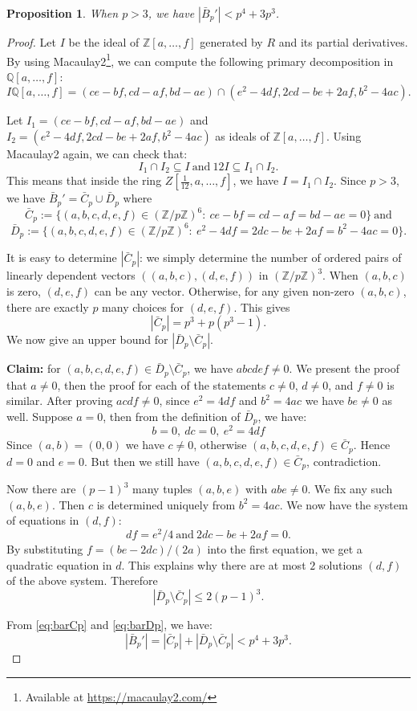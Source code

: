 \documentclass[12pt]{amsart}
\newtheorem{proposition}[theorem]{Proposition}
\newcommand{\Z}{\mathbb{Z}}
\newcommand{\Q}{\mathbb{Q}}
\numberwithin{equation}{section}
\begin{document}
\begin{proposition}\label{prop:barBp'}
    When $p>3$, we have $|\bar{B}_p'|<p^4+3p^3$.
\end{proposition}
\begin{proof}
    Let $I$ be the ideal of $\Z[a,\ldots,f]$ generated by $R$ and its partial derivatives. By using Macaulay2\footnote{Available at \url{https://macaulay2.com/}}, we can compute the following primary decomposition in $\Q[a,\ldots,f]$:
    $$I\Q[a,\ldots,f]=(ce-bf,cd-af,bd-ae)\cap (e^2-4df,2cd-be+2af,b^2-4ac).$$

    Let $I_1=(ce-bf,cd-af,bd-ae)$ and $I_2=(e^2-4df,2cd-be+2af,b^2-4ac)$ as ideals of $\Z[a,\ldots,f]$. Using Macaulay2 again, we can check that:
    $$I_1\cap I_2\subseteq I\ \text{and}\ 12I\subseteq I_1\cap I_2.$$
    This means that inside the ring $Z[\frac{1}{12},a,\ldots,f]$, we have $I=I_1\cap I_2$. Since $p>3$, we have $\bar{B}_p'=\bar{C}_p\cup\bar{D}_p$ where
    $$\bar{C}_p:=\{(a,b,c,d,e,f)\in (\Z/p\Z)^6:\ ce-bf=cd-af=bd-ae=0\}\ \text{and}$$
    $$\bar{D}_p:=\{(a,b,c,d,e,f)\in (\Z/p\Z)^6:\ e^2-4df=2dc-be+2af=b^2-4ac=0\}.$$

    It is easy to determine $|\bar{C}_p|$: we simply determine the number of ordered pairs of linearly dependent vectors $((a,b,c),(d,e,f))$ in $(\Z/p\Z)^3$. When $(a,b,c)$ is zero, $(d,e,f)$ can be any vector. Otherwise, for any given non-zero $(a,b,c)$, there are exactly $p$ many choices for $(d,e,f)$. This gives
    \begin{equation}\label{eq:barCp}
    |\bar{C}_p|= p^3+p(p^3-1).
    \end{equation}
    We now give an upper bound for $|\bar{D}_p\setminus\bar{C}_p|$. 

    \textbf{Claim:} for $(a,b,c,d,e,f)\in \bar{D}_p\setminus\bar{C}_p$, we have $abcdef\neq 0$. We present the proof that $a\neq 0$, then the  proof for each of the statements $c\neq 0$, $d\neq 0$, and $f\neq 0$ is
    similar. After proving $acdf\neq 0$, since $e^2=4df$ and $b^2=4ac$ we have $be\neq 0$ as well.
    Suppose $a=0$, then from the definition of $\bar{D}_p$, we have:
    $$b=0,\ dc=0,\ e^2=4df$$
    Since $(a,b)=(0,0)$ we have $c\neq 0$, otherwise $(a,b,c,d,e,f)\in\bar{C}_p$. Hence $d=0$ and $e=0$. But then we still have $(a,b,c,d,e,f)\in\bar{C}_p$, contradiction.

    Now there are $(p-1)^3$ many tuples $(a,b,e)$ with $abe\neq 0$. We fix any such $(a,b,e)$. Then
    $c$ is determined uniquely from $b^2=4ac$. We now have the system of equations in $(d,f)$:
    $$df=e^2/4\ \text{and}\ 2dc-be+2af=0.$$
    By substituting $f=(be-2dc)/(2a)$ into the first equation, we get a quadratic equation in $d$. This explains why there are at most $2$ solutions $(d,f)$ of the above system.  Therefore
    \begin{equation}\label{eq:barDp}
    |\bar{D}_p\setminus\bar{C}_p|\leq 2(p-1)^3.
    \end{equation}

    From \eqref{eq:barCp} and \eqref{eq:barDp}, we have:
    $$|\bar{B}_p'|=|\bar{C}_p|+|\bar{D}_p\setminus\bar{C}_p|<p^4+3p^3.$$
    \end{proof}
\end{document}
